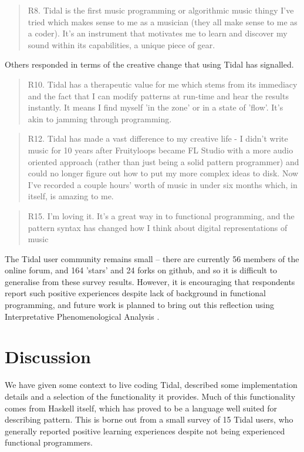 \documentclass[authoryear,preprint]{sigplanconf}
\begin{document}
\begin{quotation} R8. Tidal is the first music programming or
algorithmic music thingy I've tried which makes sense to me as a
musician (they all make sense to me as a coder). It's an instrument
that motivates me to learn and discover my sound within its
capabilities, a unique piece of gear.
\end{quotation}

Others responded in terms of the creative change that using Tidal has
signalled.

\begin{quotation}R10. Tidal has a therapeutic value for me which stems from its
immediacy and the fact that I can modify patterns at run-time and hear
the results instantly. It means I find myself 'in the zone' or in a
state of 'flow'. It's akin to jamming through programming.
\end{quotation}

\begin{quotation}
R12. Tidal has made a vast difference to my creative life - I didn't
write music for 10 years after Fruityloops became FL Studio with a
more audio oriented approach (rather than just being a solid pattern
programmer) and could no longer figure out how to put my more complex
ideas to disk. Now I've recorded a couple hours' worth of music in
under six months which, in itself, is amazing to me.
\end{quotation}

\begin{quotation}
R15. I'm loving it. It's a great way in to functional programming, and
the pattern syntax has changed how I think about digital
representations of music
\end{quotation}

The Tidal user community remains small -- there are currently 56
members of the online forum, and 164 'stars' and 24 forks on github,
and so it is difficult to generalise from these survey
results. However, it is encouraging that respondents report such
positive experiences despite lack of background in functional
programming, and future work is planned to bring out this reflection
using Interpretative Phenomenological Analysis
\citep[IPA;][]{Smith04}.

\section{Discussion}

We have given some context to live coding Tidal, described some
implementation details and a selection of the functionality it
provides. Much of this functionality comes from Haskell itself, which
has proved to be a language well suited for describing pattern. This
is borne out from a small survey of 15 Tidal users, who generally
reported positive learning experiences despite not being experienced
functional programmers.
\end{document}
